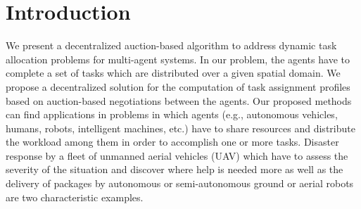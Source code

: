 \documentclass{ifacconf}
\begin{document}
\maketitle
\thispagestyle{plain}
\pagestyle{plain}

\section{Introduction}\label{s:intro}

We present a decentralized auction-based algorithm to address dynamic task allocation problems for multi-agent systems. In our problem, the agents have to complete a set of tasks which are distributed over a given spatial domain. We propose a decentralized solution for the computation of task assignment profiles based on auction-based negotiations between the agents.
Our proposed methods can find applications in problems in which agents (e.g., autonomous vehicles, humans, robots, intelligent machines, etc.) have to share resources and distribute the workload among them in order to accomplish one or more tasks. 
Disaster response by a fleet of unmanned aerial vehicles (UAV) which have to assess the severity of the situation and discover where help is needed more as well as the delivery of packages by autonomous or semi-autonomous ground or aerial robots are two characteristic examples.

\end{document}
